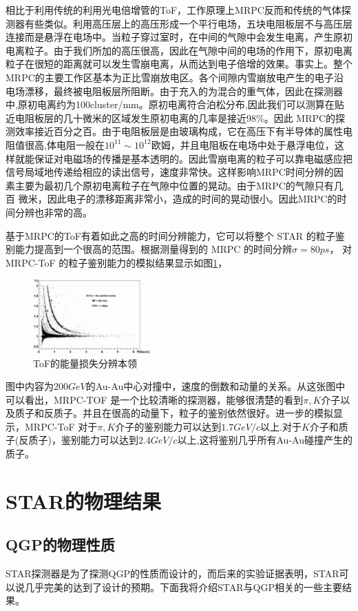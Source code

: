 \documentclass[%
 reprint,
 amsmath,amssymb,
 aps,
]{revtex4-1}
\begin{document}
相比于利用传统的利用光电倍增管的ToF，工作原理上MRPC反而和传统的气体探测器有些类似。利用高压层上的高压形成一个平行电场，五块电阻板层不与高压层连接而是悬浮在电场中。当粒子穿过室时，在中间的气隙中会发生电离，产生原初电离粒子。由于我们所加的高压很高，因此在气隙中间的电场的作用下，原初电离粒子在很短的距离就可以发生雪崩电离，从而达到电子倍增的效果。事实上。整个MRPC的主要工作区基本为正比雪崩放电区。各个间隙内雪崩放电产生的电子沿电场漂移，最终被电阻板层所阻断。由于充入的为混合的重气体，因此在探测器中,原初电离约为100cluster/mm。原初电离符合泊松分布,因此我们可以测算在贴近电阻板层的几十微米的区域发生原初电离的几率是接近98\%。因此 MRPC的探测效率接近百分之百。由于电阻板层是由玻璃构成，它在高压下有半导体的属性电阻值很高,体电阻一般在$10^{11}\sim10^{12}$欧姆，并且电阻板在电场中处于悬浮电位，这样就能保证对电磁场的传播是基本透明的。因此雪崩电离的粒子可以靠电磁感应把信号局域地传递给相应的读出信号，速度非常快。这样影响MRPC时间分辨的因素主要为最初几个原初电离粒子在气隙中位置的晃动。由于MRPC的气隙只有几百 微米，因此电子的漂移距离非常小，造成的时间的晃动很小。因此MRPC的时间分辨也非常的高。

基于MRPC的ToF有着如此之高的时间分辨能力，它可以将整个 STAR 的粒子鉴别能力提高到一个很高的范围。根据测量得到的 MRPC 的时间分辨$\sigma=80\si{ps}$， 对 MRPC-ToF 的粒子鉴别能力的模拟结果显示如图\ref{fig:ToF}，
\begin{figure}[htbp]
    \includegraphics[width = 0.4\textwidth]{Plots/dEdxToF.png}
    \caption{\label{fig:ToF}ToF的能量损失分辨本领}
\end{figure}
图中内容为$200\si{GeV}$的Au-Au中心对撞中，速度的倒数和动量的关系。从这张图中可以看出，MRPC-TOF 是一个比较清晰的探测器，能够很清楚的看到$\pi,K$介子以及质子和反质子。并且在很高的动量下，粒子的鉴别依然很好。进一步的模拟显示，MRPC-ToF 对于$\pi,K$介子的鉴别能力可以达到$1.7\si{GeV/c}$以上.对于$K$介子和质子(反质子)，鉴别能力可以达到$2.4\si{GeV/c}$以上,这将鉴别几乎所有Au-Au碰撞产生的质子。

\section{\label{sec:PhyRes}STAR的物理结果}
\subsection{\label{sec:qgp}QGP的物理性质}
STAR探测器是为了探测QGP的性质而设计的，而后来的实验证据表明，STAR可以说几乎完美的达到了设计的预期。下面我将介绍STAR与QGP相关的一些主要结果。
\end{document}

